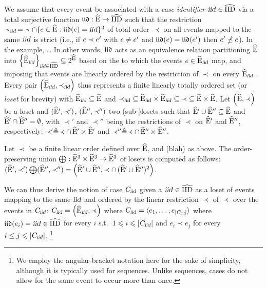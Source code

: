 \begin{newj}
%
We assume that every event be associated with a \emph{case identifier} $\textrm{\textsl{iid}} \in \widehat{\mathrm{IID}}$ via a total surjective function $\mathfrak{iid}: \widehat{\mathrm{E}} \to \widehat{\mathrm{IID}}$ such that the restriction $\prec_{\textrm{\textsl{iid}}} \,=\, \prec \cap \{ e \in \widehat{\mathrm{E}}: \mathfrak{iid}(e) = \textrm{\textsl{iid}} \}^2$ of total order $\prec$ on all events mapped to the same $\textrm{\textsl{iid}}$ is strict (i.e., if $e \prec e'$ with $e \neq e'$ and $\mathfrak{iid}(e) = \mathfrak{iid}(e')$ then $e' \npreceq e$).
%
In the example, \ldots{}
%
In other words, $\mathfrak{iid}$ acts as an equivalence relation partitioning $\widehat{\mathrm{E}}$ into $\left\{ \widehat{\mathrm{E}}_{\textrm{\textsl{iid}}} \right\}_{\textrm{\textsl{iid}} \in \widehat{\mathrm{IID}}} \subseteq 2^{\widehat{\mathrm{E}}}$ based on the {\CId} to which the events $e \in \widehat{\mathrm{E}}_{\textrm{\textsl{iid}}}$ map, and imposing that events are linearly ordered by the restriction of $\prec$ on every $\widehat{\mathrm{E}}_{\textrm{\textsl{iid}}}$.
Every pair $\left( \widehat{\mathrm{E}}_{\textrm{\textsl{iid}}}, \prec_{\textrm{\textsl{iid}}} \right)$ thus represents a finite linearly totally ordered set (or \emph{loset} for brevity) with $\widehat{\mathrm{E}}_{\textrm{\textsl{iid}}} \subseteq \widehat{\mathrm{E}}$ and $\prec_{\textrm{\textsl{iid}}} \;\subseteq \widehat{\mathrm{E}}_{\textrm{\textsl{iid}}} \times \widehat{\mathrm{E}}_{\textrm{\textsl{iid}}} \subseteq\; \prec \;\subseteq \widehat{\mathrm{E}} \times \widehat{\mathrm{E}}$.
Let $\left(\widehat{\mathrm{E}}, \prec\right)$ be a loset and $(\widehat{\mathrm{E}}', \prec')$, $(\widehat{\mathrm{E}}'', \prec'')$ two (sub-)losets such that $\widehat{\mathrm{E}}' \cup \widehat{\mathrm{E}}'' \subseteq \widehat{\mathrm{E}}$ and $\widehat{\mathrm{E}}' \cap \widehat{\mathrm{E}}'' = \emptyset$, with $\prec'$ and $\prec''$ being the restrictions of $\prec$ on $\widehat{\mathrm{E}}'$ and $\widehat{\mathrm{E}}''$, respectively:
$\prec' \triangleq \prec \cap \, \widehat{\mathrm{E}}' \times \widehat{\mathrm{E}}'$ and $\prec'' \triangleq \prec \cap \, \widehat{\mathrm{E}}'' \times \widehat{\mathrm{E}}''$.
\begin{definition}\label{def:order-prev:union}
Let $\prec$ be a finite linear order defined over $\widehat{\mathrm{E}}$, and (blah) as above. The order-preserving union $\bigoplus: \widehat{\mathrm{E}}^3 \times \widehat{\mathrm{E}}^3 \to \widehat{\mathrm{E}}^3$ of losets is computed as follows: $(\widehat{\mathrm{E}}', \prec') \bigoplus (\widehat{\mathrm{E}}'', \prec'') = \left(\widehat{\mathrm{E}}' \cup \widehat{\mathrm{E}}'', \prec \cap\, (\widehat{\mathrm{E}}'\cup\widehat{\mathrm{E}}'')^2\right)$.
\end{definition}
%
We can thus derive the notion of case $\textsl{C}_{\textrm{\textsl{iid}}}$ given a $\textrm{\textsl{iid}} \in \widehat{\mathrm{IID}}$ as a loset of events mapping to the same $\textrm{\textsl{iid}}$ and ordered by the linear restriction $\prec$ of $\prec$ over the events in $\textsl{C}_{\textrm{\textsl{iid}}}$: $\textsl{C}_{\textrm{\textsl{iid}}}=\left(\widehat{\mathrm{E}}_{\textrm{\textsl{iid}}}, \prec\right)$ where $\textsl{C}_{\textrm{\textsl{iid}}} = \langle e_1, \ldots, e_{|\textsl{C}_{\textrm{\textsl{iid}}}|} \rangle$ where $\mathfrak{iid}(e_i) = \textrm{\textsl{iid}} \in \widehat{\mathrm{IID}}$ for every $i$ s.t.\ $ 1 \leqslant i \leqslant |\textsl{C}_{\textrm{\textsl{iid}}}|$ and $e_i \prec e_j$ for every $ i \leq j \leqslant |\textsl{C}_{\textrm{\textsl{iid}}}|$.%
\footnote{We employ the angular-bracket notation here for the sake of simplicity, although it is typically used for sequences. Unlike sequences, cases do not allow for the same event to occur more than once.}

\end{newj}
